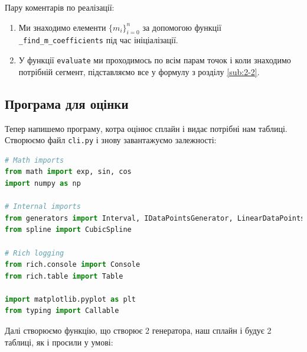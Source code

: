 \documentclass[12pt]{extarticle}
\begin{document}
Пару коментарів по реалізації:
\begin{enumerate}
    \item Ми знаходимо елементи $\{m_i\}_{i=0}^n$ за допомогою функції \texttt{\_find\_m\_coefficients} під час ініціалізації.
    \item У функції \texttt{evaluate} ми проходимось по всім парам точок і коли знаходимо потрібній сегмент, підставляємо все у формулу з розділу \ref{sub:2-2}.
\end{enumerate}

\subsection{Програма для оцінки}

Тепер напишемо програму, котра оцінює сплайн і видає потрібні нам таблиці. Створюємо файл \texttt{cli.py} і знову завантажуємо залежності:
\begin{lstlisting}[language=Python, caption=Завантаження залежностей]
# Math imports
from math import exp, sin, cos
import numpy as np

# Internal imports
from generators import Interval, IDataPointsGenerator, LinearDataPointsGenerator, CosineDataPointsGenerator
from spline import CubicSpline

# Rich logging
from rich.console import Console
from rich.table import Table

import matplotlib.pyplot as plt
from typing import Callable
\end{lstlisting}


Далі створюємо функцію, що створює 2 генератора, наш сплайн і будує 2 таблиці, як і просили у умові:
\end{document}
